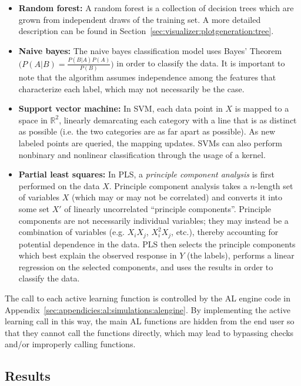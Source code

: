 \tablespacing
\begin{itemize}
	\item \textbf{Random forest:} A random forest is a collection of decision 
	trees which are grown from independent draws of the training set. A more 
	detailed description can be found in 
	Section~\ref{sec:visualizer:plotgeneration:tree}.
	\item \textbf{Naive bayes:} The naive bayes classification model uses 
	Bayes' Theorem $\big(P(A|B) = \frac{P(B|A)P(A)}{P(B)}\big)$ in order to 
	classify the data. It is important to note that the algorithm assumes 
	independence among the features that characterize each label, which may not 
	necessarily be the case.
	\item \textbf{Support vector machine:} In SVM, each data point in $X$ is 
	mapped to a space in $\mathbb{R}^2$, linearly demarcating each category 
	with a line that is as distinct as possible (i.e. the two categories are as 
	far apart as possible). As new labeled points are queried, the mapping 
	updates. SVMs can also perform nonbinary and nonlinear classification 
	through the usage of a kernel.
	\item \textbf{Partial least squares:} In PLS, a \textit{principle component 
	analysis} is first performed on the data $X$. Principle component analysis 
	takes a $n$-length set of variables $X$ (which may or may not be 
	correlated) and converts it into some set $X'$ of linearly uncorrelated 
	``principle components''. Principle components are not necessarily 
	individual variables; they may instead be a combination of variables (e.g. 
	$X_iX_j$, $X^2_iX_j$, etc.), thereby accounting for potential dependence in 
	the data. PLS then selects the principle components which best explain the 
	observed response in $Y$ (the labels), performs a linear regression on the 
	selected components, and uses the results in order to classify the data. 
\end{itemize}
\bodyspacing

The call to each active learning function is controlled by the AL engine code 
in Appendix~\ref{sec:appendicies:al:simulations:alengine}. By implementing the 
active learning call in this way, the main AL functions are hidden from the end 
user so that they cannot call the functions directly, which may lead to 
bypassing checks and/or improperly calling functions.



\subsection{Results}
\label{sec:al:simulation:results}


